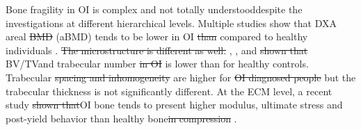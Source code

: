 \documentclass[a4paper,fleqn]{DC_ArtStyle}
\providecommand{\DIFadd}[1]{{\protect\color{blue}{#1}}} %
\providecommand{\DIFdel}[1]{{\protect\color{red}\sout{#1}}}                      %
\providecommand{\DIFaddbegin}{} %
\providecommand{\DIFaddend}{} %
\providecommand{\DIFdelbegin}{} %
\providecommand{\DIFdelend}{} %
\begin{document}
Bone fragility in OI is complex and not totally understood\DIFaddbegin \DIFadd{, }\DIFaddend despite the investigations at different hierarchical levels. Multiple studies show that DXA areal \DIFdelbegin \DIFdel{BMD }\DIFdelend \DIFaddbegin \DIFadd{bone mineral density }\DIFaddend (aBMD) tends to be lower in OI \DIFdelbegin \DIFdel{than }\DIFdelend compared to healthy individuals \cite{Folkestad2012,Lindahl2015,Scheres2018}.  \DIFdelbegin \DIFdel{The microstructure is different as well. }\DIFdelend \citeauthor{Folkestad2012}\cite{Folkestad2012}, \citeauthor{Kocijan2015}\cite{Kocijan2015}, and \citeauthor{Rolvien2018}\cite{Rolvien2018} \DIFdelbegin \DIFdel{shown that }\DIFdelend \DIFaddbegin \DIFadd{have shown that the microstructure is different as well, namely bone volume fraction (}\DIFaddend BV/TV\DIFaddbegin \DIFadd{) }\DIFaddend and trabecular number \DIFdelbegin \DIFdel{in OI }\DIFdelend \DIFaddbegin \DIFadd{(Tb.N.) in OI bone }\DIFaddend is lower than for healthy controls. Trabecular \DIFdelbegin \DIFdel{spacing and inhomogeneity }\DIFdelend \DIFaddbegin \DIFadd{separation (Tb.Sp.) and inhomogeneity (Tb.Sp.SD) }\DIFaddend are higher for \DIFdelbegin \DIFdel{OI diagnosed people }\DIFdelend \DIFaddbegin \DIFadd{individuals with OI }\DIFaddend but the trabecular thickness \DIFaddbegin \DIFadd{(Tb.Th.) }\DIFaddend is not significantly different. At the ECM level, a recent study \DIFdelbegin \DIFdel{shown that}\DIFdelend \DIFaddbegin \DIFadd{showed that, in compression, }\DIFaddend OI bone tends to present higher modulus, ultimate stress and post-yield behavior than healthy bone\DIFdelbegin \DIFdel{in compression }\DIFdelend \DIFaddbegin \DIFadd{, mostly affected by the higher degree of mineralization of OI bone }\DIFaddend \cite{Indermaur2021}.\\
\end{document}
